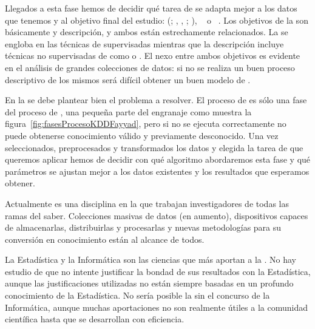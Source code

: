
Llegados a esta fase hemos de decidir qué tarea de \dm se adapta mejor a los datos que tenemos y al objetivo final del estudio: \clustering (\cite{NgHan-EfficientAndEffectiveClusteringMethods-1994}; \citeauthor{PerkowitzEtzioni-TowardsAdaptiveWebSites-2000}, \cite*{PerkowitzEtzioni-AWSConceptualClusterMining-1999}, \cite*{PerkowitzEtzioni-TowardsAdaptiveWebSites-2000}; \cite{Goethals-SurveyOnFPM-2003,SaglamSalmanSayinTurkay-MixedIntegerClustering-2006,TsayHsuYu-FIUTaNewMethodForFIM-2009}), \clasificacion~\citep{LiuHsu-PostAnalysisOfLearnedRules-1996,LiuHsuMa-IntegratingClassificationAndARM-1998,RokachMaimon-DataMiningWithDecisionTreesTheoryAndApplications2nd-2014} o \regresion~\citep{KohaviQuinlan-DecisionTreeDiscovery-1999}. Los objetivos de la \DM son básicamente \prediccion y descripción, y ambos están estrechamente relacionados. La \prediccion se engloba en las técnicas de \DM supervisadas mientras que la descripción incluye técnicas no supervisadas de \DM como \clasificacion o . El nexo entre ambos objetivos es evidente en el análisis de grandes colecciones de datos: si no se realiza un buen proceso descriptivo de los mismos será difícil obtener un buen modelo de \prediccion.

En la \dm se debe plantear bien el problema a resolver. El proceso de \DM es sólo una fase del proceso de \KDD, una pequeña parte del engranaje como muestra la figura~\ref{fig:fasesProcesoKDDFayyad}, pero si no se ejecuta correctamente no puede obtenerse conocimiento válido y previamente desconocido. Una vez seleccionados, preprocesados y transformados los datos y elegida la tarea de \DM que queremos aplicar hemos de decidir con qué algoritmo abordaremos esta fase y qué parámetros se ajustan mejor a los datos existentes y los resultados que esperamos obtener.

Actualmente es una disciplina en la que trabajan investigadores de todas las ramas del saber. Colecciones masivas de datos (en aumento), dispositivos capaces de almacenarlas, distribuirlas y procesarlas y nuevas metodologías para su conversión en conocimiento están al alcance de todos.

La Estadística y la Informática son las ciencias que más aportan a la \dm. No hay estudio de \DM que no intente justificar la bondad de sus resultados con la Estadística, aunque las justificaciones utilizadas no están siempre basadas en un profundo conocimiento de la Estadística. No sería posible la \DM sin el concurso de la Informática, aunque muchas aportaciones no son realmente útiles a la comunidad científica hasta que se desarrollan con eficiencia.

